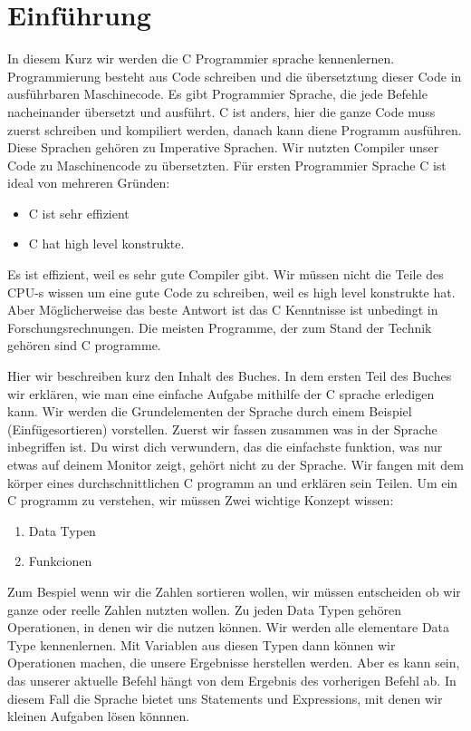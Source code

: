 \section{Einführung}
In diesem Kurz wir werden die C Programmier sprache kennenlernen. Programmierung besteht aus Code schreiben und die übersetztung dieser Code in
ausführbaren Maschinecode.
Es gibt Programmier Sprache, die jede Befehle nacheinander übersetzt und ausführt. C ist anders, hier die ganze Code muss zuerst schreiben und
kompiliert werden,  danach kann diene Programm ausführen. Diese Sprachen gehören zu Imperative Sprachen. Wir nutzten Compiler unser Code zu Maschinencode zu übersetzten. Für ersten Programmier Sprache C ist ideal
von mehreren Gründen:
\begin{itemize}
\item C ist sehr effizient
\item C hat high level konstrukte.
\end{itemize}
Es ist effizient, weil es sehr gute Compiler gibt. Wir müssen nicht die Teile des CPU-s wissen um eine gute Code zu schreiben,
weil es high level konstrukte hat. Aber M\"oglicherweise das beste Antwort ist das C Kenntnisse ist unbedingt in Forschungsrechnungen. Die meisten Programme,
der zum Stand der Technik geh\"oren sind C programme.


Hier wir beschreiben kurz den Inhalt des Buches. In dem ersten Teil des Buches wir erklären, wie man eine einfache Aufgabe mithilfe der C
sprache erledigen kann. Wir werden die Grundelementen der Sprache durch einem Beispiel (Einfügesortieren) vorstellen. Zuerst wir fassen
zusammen was in der Sprache inbegriffen ist. Du wirst dich verwundern, das die einfachste funktion, was nur etwas auf deinem Monitor zeigt,
geh\"ort nicht zu der Sprache. Wir fangen mit dem k\"orper eines durchschnittlichen C programm an  und erkl\"aren sein Teilen.
Um ein C programm zu verstehen, wir müssen Zwei wichtige Konzept wissen:
\begin{enumerate}
\item Data Typen
\item Funkcionen
\end{enumerate}

Zum Bespiel wenn wir die Zahlen sortieren wollen, wir müssen entscheiden ob wir ganze oder reelle Zahlen nutzten wollen. Zu jeden Data
Typen gehören Operationen, in denen wir die nutzen k\"onnen. Wir werden alle elementare Data Type kennenlernen. Mit Variablen aus diesen
Typen dann k\"onnen wir Operationen machen, die unsere Ergebnisse herstellen werden. Aber es kann sein, das unserer aktuelle Befehl hängt
von dem Ergebnis des vorherigen Befehl ab. In diesem Fall die Sprache bietet uns Statements und Expressions, mit denen wir kleinen Aufgaben
lösen könnnen.

